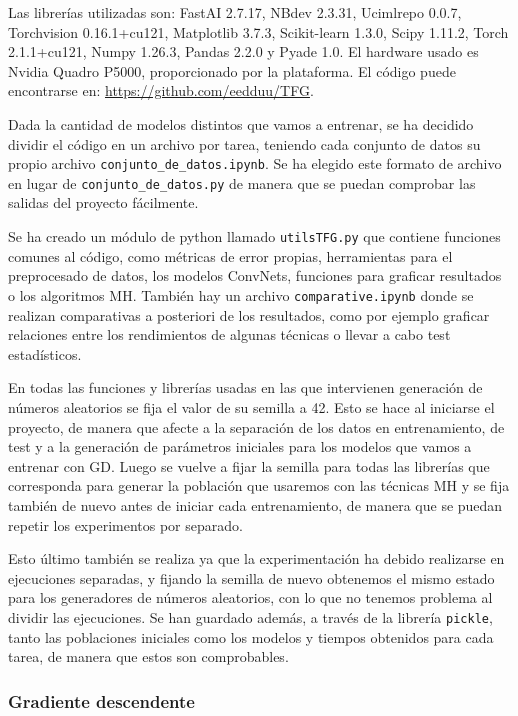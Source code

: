  Las librerías utilizadas son: FastAI 2.7.17, NBdev 2.3.31, Ucimlrepo 0.0.7, Torchvision 0.16.1+cu121, Matplotlib 3.7.3, Scikit-learn 1.3.0, Scipy 1.11.2, Torch 2.1.1+cu121, Numpy 1.26.3, Pandas 2.2.0 y Pyade 1.0. El hardware usado es Nvidia Quadro P5000, proporcionado por la plataforma. El código puede encontrarse en: \url{https://github.com/eedduu/TFG}. 

Dada la cantidad de modelos distintos que vamos a entrenar, se ha decidido dividir el código en un archivo por tarea, teniendo cada conjunto de datos su propio archivo \verb|conjunto_de_datos.ipynb|. Se ha elegido este formato de archivo en lugar de \verb|conjunto_de_datos.py| de manera que se puedan comprobar las salidas del proyecto fácilmente. 

Se ha creado un módulo de python llamado \verb|utilsTFG.py| que contiene funciones comunes al código, como métricas de error propias, herramientas para el preprocesado de datos, los modelos ConvNets, funciones para graficar resultados o los algoritmos MH. También hay un archivo \verb|comparative.ipynb| donde se realizan comparativas a posteriori de los resultados, como por ejemplo graficar relaciones entre los rendimientos de algunas técnicas o llevar a cabo test estadísticos.


En todas las funciones y librerías usadas en las que intervienen generación de números aleatorios se fija el valor de su semilla a 42. Esto se hace al iniciarse el proyecto, de manera que afecte a la separación de los datos en entrenamiento, de test y a la generación de parámetros iniciales para los modelos que vamos a entrenar con GD. Luego se vuelve a fijar la semilla para todas las librerías que corresponda para generar la población que usaremos con las técnicas MH y se fija también de nuevo antes de iniciar cada entrenamiento, de manera que se puedan repetir los experimentos por separado.

Esto último también se realiza ya que la experimentación ha debido realizarse en ejecuciones separadas, y fijando la semilla de nuevo obtenemos el mismo estado para los generadores de números aleatorios, con lo que no tenemos problema al dividir las ejecuciones. Se han guardado además, a través de la librería \verb|pickle|, tanto las poblaciones iniciales como los modelos y tiempos obtenidos para cada tarea, de manera que estos son comprobables.




\subsubsection{Gradiente descendente}

